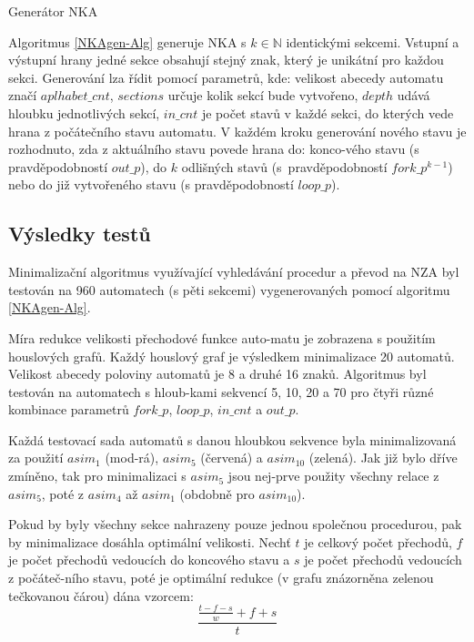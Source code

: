 \begin{algorithm}[h]
        \;

        \normalsize
        \caption{Generátor NKA}
        \label{NKAgen-Alg}
    \end{algorithm}

    Algoritmus \ref{NKAgen-Alg} generuje NKA s $k \in \mathbb{N}$ identickými sekcemi. Vstupní a výstupní hrany jedné sekce obsahují stejný znak, který je unikátní pro každou sekci. Generování lza řídit pomocí parametrů, kde: velikost abecedy automatu značí $aplhabet\_cnt$, $sections$ určuje kolik sekcí bude vytvořeno, $depth$ udává hloubku jednotlivých sekcí, $in\_cnt$ je počet stavů v každé sekci, do kterých vede hrana z počátečního stavu automatu. V každém kroku generování nového stavu je rozhodnuto, zda z aktuálního stavu povede hrana do: konco-vého stavu (s pravděpodobností $out\_p$), do $k$ odlišných stavů (s~pravděpodobností $fork\_p^{k-1}$) nebo do již vytvořeného stavu (s pravděpodobností $loop\_p$).

    \subsection{Výsledky testů}
        Minimalizační algoritmus využívající vyhledávání procedur a převod na NZA byl testován na 960 automatech (s pěti sekcemi) vygenerovaných pomocí algoritmu \ref{NKAgen-Alg}.

        Míra redukce velikosti přechodové funkce auto-matu je zobrazena s použitím houslových grafů. Každý houslový graf je výsledkem minimalizace 20 automatů. Velikost abecedy poloviny automatů je 8 a druhé 16 znaků. Algoritmus byl testován na automatech s hloub-kami sekvencí 5, 10, 20 a 70 pro čtyři různé kombinace parametrů $fork\_p$, $loop\_p$, $in\_cnt$ a $out\_p$.

        Každá testovací sada automatů s danou hloubkou sekvence byla minimalizovaná za použití $asim_1$ (mod-rá), $asim_5$ (červená) a $asim_{10}$ (zelená). Jak již bylo dříve zmíněno, tak pro minimalizaci s $asim_5$ jsou nej-prve použity všechny relace z $asim_5$, poté z $asim_4$ až $asim_1$ (obdobně pro $asim_{10}$).

        Pokud by byly všechny sekce nahrazeny pouze jednou společnou procedurou, pak by minimalizace dosáhla optimální velikosti. Nechť $t$ je celkový počet přechodů, $f$ je počet přechodů vedoucích do koncového stavu a $s$ je počet přechodů vedoucích z počáteč-ního stavu, poté je optimální redukce (v grafu znázorněna zelenou tečkovanou čárou) dána vzorcem:
        $$
        \frac{\frac{t-f-s}{w}+f+s}{t}
        $$

